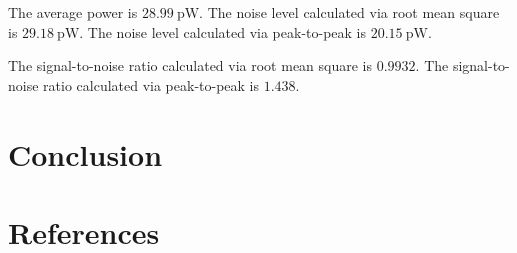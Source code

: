 \documentclass[english,12pt,a4paper]{article}
\begin{document}
	The average power is $\qty{28.99}{\pico\watt}$.
	The noise level calculated via root mean square is $\qty{29.18}{\pico\watt}$.
	The noise level calculated via peak-to-peak is $\qty{20.15}{\pico\watt}$.
	
	The signal-to-noise ratio calculated via root mean square is $0.9932$.
	The signal-to-noise ratio calculated via peak-to-peak is $1.438$.
\section{Conclusion}
\section{References}
\printbibliography
\end{document}
